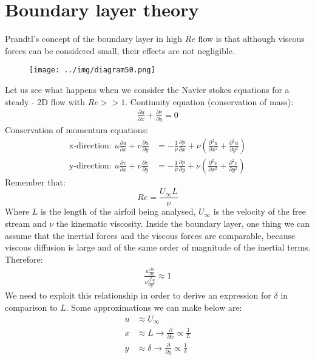 \documentclass[class=report, crop=false, 12pt,a4paper]{standalone}
\begin{document}
\section{Boundary layer theory}
Prandtl's concept of the boundary layer in high $Re$ flow is that although viscous forces can be considered small, their effects are not negligible.
\begin{figure}[H]
  \centering
  \texttt{[image: ../img/diagram50.png]}
\end{figure}
Let us see what happens when we consider the Navier stokes equations for a steady - 2D flow with $Re >> 1$. Continuity equation (conservation of mass):
\begin{align}
  \frac{\partial u}{\partial x} + \frac{\partial v}{\partial y} = 0
\end{align}
Conservation of momentum equations:
\begin{align}
  \textrm{x-direction: } u\frac{\partial u}{\partial x} + v \frac{\partial u }{\partial y} &= - \frac{1}{\rho} \frac{\partial p}{\partial x} + \nu \left(\frac{\partial^2 u}{\partial x^2} + \frac{\partial^2 u}{\partial y^2}\right)\\
  \textrm{y-direction: } u \frac{\partial v}{\partial x} + v\frac{\partial v}{\partial y} &= -\frac{1}{\rho}\frac{\partial p}{\partial y} + \nu \left(\frac{\partial^2 v}{\partial x^2} + \frac{\partial^2 v}{\partial y^2}\right)
\end{align}
Remember that:
\begin{equation}
  Re = \frac{U_\infty L}{\nu}
\end{equation}
Where $L$ is the length of the airfoil being analysed, $U_\infty$ is the velocity of the free stream and $\nu$ the kinematic viscosity. Inside the boundary layer, one thing we can assume that the inertial forces and the viscous forces are comparable, because viscous diffusion is large and of the same order of magnitude of the inertial terms. Therefore:
\begin{align}
  \frac{u\frac{\partial u}{\partial x}}{\nu \frac{\partial^2 u}{\partial y^2}} \approx 1
\end{align}
We need to exploit this relationship in order to derive an expression for $\delta$ in comparison to $L$. Some approximations we can make below are:
\begin{align}
  u &\approx U_\infty\\
  x &\approx L \rightarrow \frac{\partial}{\partial x} \propto \frac{1}{L}\\
  y &\approx \delta \rightarrow \frac{\partial}{\partial y} \propto \frac{1}{\delta}
\end{align}
\end{document}

